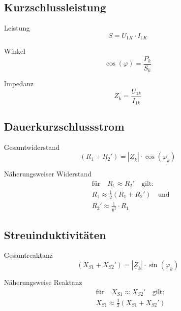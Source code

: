 \documentclass[11pt, a4paper, final, fleqn, twocolumn]{article}
\numberwithin{equation}{subsection}
\begin{document}
\subsection{Kurzschlussleistung}

Leistung
\begin{equation}
    S = U_{1K} \cdot I_{1K}
\end{equation}

\noindent Winkel
\begin{equation}
    \cos(\varphi) = \frac{P_k}{S_k}
\end{equation}

\noindent Impedanz
\begin{equation}
    Z_k = \frac{U_{1k}}{I_{1k}}
\end{equation}


\subsection{Dauerkurzschlussstrom}

Gesamtwiderstand
\begin{equation}
    (R_1 + R_2') = |\underline{Z}_k| \cdot \cos(\varphi_k)
\end{equation}

\noindent Näherungsweiser Widerstand
\begin{equation}
\begin{split}
    & \text{für} \quad R_1 \approx R_2' \quad \text{gilt:} \\
    & R_1 \approx \frac{1}{2}(R_1 + R_2') \quad \text{und} \\
    & R_2' \approx \frac{1}{\text{ü}^2}\cdot R_1
\end{split}
\end{equation}


\subsection{Streuinduktivitäten}

Gesamtreaktanz
\begin{equation}
    (X_{S1} + X_{S2}') = |\underline{Z}_k| \cdot \sin(\varphi_k)
\end{equation}

\noindent Näherungsweise Reaktanz
\begin{equation}
\begin{split}
    & \text{für} \quad X_{S1} \approx X_{S2}' \quad \text{gilt:} \\
    & X_{S1} \approx \frac{1}{2}(X_{S1} + X_{S2}')
\end{split}
\end{equation}
\end{document}
